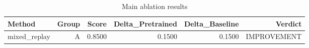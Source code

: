 \begin{table}[htbp]
\centering
\caption{Main ablation results}
\label{tab:main-results}
\begin{tabular}{lrrrrr}
\toprule
\textbf{Method} & \textbf{Group} & \textbf{Score} & \textbf{Delta\_Pretrained} & \textbf{Delta\_Baseline} & \textbf{Verdict} \\
\midrule
mixed\_replay & A & 0.8500 & 0.1500 & 0.1500 & IMPROVEMENT \\
\bottomrule
\end{tabular}
\end{table}